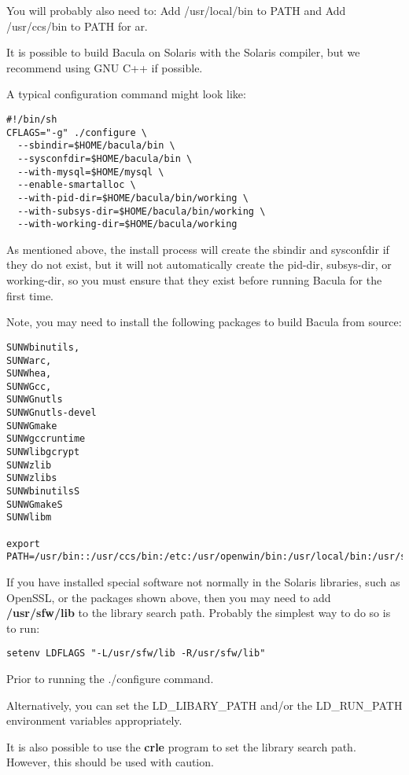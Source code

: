 You will probably also need to: Add /usr/local/bin to PATH and Add
/usr/ccs/bin to PATH for ar. 

It is possible to build Bacula on Solaris with the Solaris compiler, but
we recommend using GNU C++ if possible.  

A typical configuration command might look like:

\footnotesize
\begin{verbatim}
#!/bin/sh
CFLAGS="-g" ./configure \
  --sbindir=$HOME/bacula/bin \
  --sysconfdir=$HOME/bacula/bin \
  --with-mysql=$HOME/mysql \
  --enable-smartalloc \
  --with-pid-dir=$HOME/bacula/bin/working \
  --with-subsys-dir=$HOME/bacula/bin/working \
  --with-working-dir=$HOME/bacula/working
\end{verbatim}
\normalsize

As mentioned above, the install process will create the sbindir and sysconfdir
if they do not exist, but it will not automatically create the pid-dir,
subsys-dir, or working-dir, so you must ensure that they exist before running
Bacula for the first time.

Note, you may need to install the following packages to build Bacula
from source:
\footnotesize
\begin{verbatim}
SUNWbinutils,
SUNWarc,
SUNWhea,
SUNWGcc,
SUNWGnutls
SUNWGnutls-devel
SUNWGmake
SUNWgccruntime
SUNWlibgcrypt
SUNWzlib
SUNWzlibs
SUNWbinutilsS
SUNWGmakeS
SUNWlibm

export 
PATH=/usr/bin::/usr/ccs/bin:/etc:/usr/openwin/bin:/usr/local/bin:/usr/sfw/bin:/opt/sfw/bin:/usr/ucb:/usr/sbin
\end{verbatim}
\normalsize

If you have installed special software not normally in the Solaris
libraries, such as OpenSSL, or the packages shown above, then you may need
to add {\bf /usr/sfw/lib} to the library search path.  Probably the
simplest way to do so is to run:

\footnotesize
\begin{verbatim}
setenv LDFLAGS "-L/usr/sfw/lib -R/usr/sfw/lib"
\end{verbatim}
\normalsize

Prior to running the ./configure command.

Alternatively, you can set the LD\_LIBARY\_PATH and/or the LD\_RUN\_PATH
environment variables appropriately.

It is also possible to use the {\bf crle} program to set the library
search path.  However, this should be used with caution.

